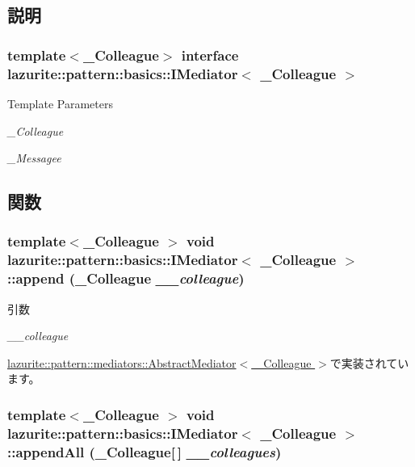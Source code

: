 \subsection{説明}
\subsubsection*{template$<$\_\-Colleague$>$ interface lazurite::pattern::basics::IMediator$<$ \_\-Colleague $>$}


\begin{DoxyTemplParams}{Template Parameters}
\item[{\em \_\-Colleague}]\item[{\em \_\-Messagee}]\end{DoxyTemplParams}


\subsection{関数}
\hypertarget{interfacelazurite_1_1pattern_1_1basics_1_1_i_mediator_3_01___colleague_01_4_a2141258ad0ee2979eb65d5a39cb464a8}{
\subsubsection[{append}]{\setlength{\rightskip}{0pt plus 5cm}template$<$\_\-Colleague $>$ void lazurite::pattern::basics::IMediator$<$ \_\-Colleague $>$::append (\_\-Colleague {\em \_\-\_\-colleague})}}
\label{interfacelazurite_1_1pattern_1_1basics_1_1_i_mediator_3_01___colleague_01_4_a2141258ad0ee2979eb65d5a39cb464a8}

\begin{DoxyParams}{引数}
\item[{\em \_\-\_\-colleague}]\end{DoxyParams}


\hyperlink{classlazurite_1_1pattern_1_1mediators_1_1_abstract_mediator_3_01___colleague_01_4_ad1f32a3e3f783bbb6a5f09de8c991554}{lazurite::pattern::mediators::AbstractMediator$<$ \_\-Colleague $>$}で実装されています。\hypertarget{interfacelazurite_1_1pattern_1_1basics_1_1_i_mediator_3_01___colleague_01_4_ae4d319025b48060df543d4d3c654bfb5}{
\subsubsection[{appendAll}]{\setlength{\rightskip}{0pt plus 5cm}template$<$\_\-Colleague $>$ void lazurite::pattern::basics::IMediator$<$ \_\-Colleague $>$::appendAll (\_\-Colleague\mbox{[}$\,$\mbox{]} {\em \_\-\_\-colleagues})}}
\label{interfacelazurite_1_1pattern_1_1basics_1_1_i_mediator_3_01___colleague_01_4_ae4d319025b48060df543d4d3c654bfb5}

